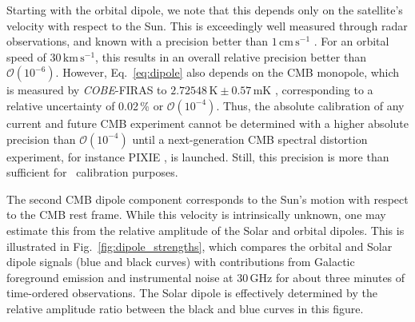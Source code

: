 \documentclass[twocolumn]{aa}
\def\COBE{\textit{COBE}}
\begin{document}
Starting with the orbital dipole, we note that this
depends only on the satellite's velocity with respect to the Sun. This
is exceedingly well measured through radar observations, and known
with a precision better than $1\,\textrm{cm}\,\textrm{s}^{-1}$
\citep{godard2009}. For an orbital speed of
$30\,\mathrm{km}\,\mathrm{s}^{-1}$, this results in an overall
relative precision better than $\mathcal{O}(10^{-6})$. However,
Eq.~\eqref{eq:dipole} also depends on the CMB monopole, which is
measured by \COBE-FIRAS to $2.72548\,\textrm{K} \pm 0.57\,\textrm{mK}$
\citep{fixsen2009}, corresponding to a relative uncertainty of
0.02\,\% or $\mathcal{O}(10^{-4})$. Thus, the absolute calibration of
any current and future CMB experiment cannot be determined with a
higher absolute precision than $\mathcal{O}(10^{-4})$ until a
next-generation CMB spectral distortion experiment, for instance PIXIE
\citep{kogut:2011}, is launched. Still, this precision is more than
sufficient for \Planck\ calibration purposes.

The second CMB dipole component corresponds to the Sun's motion with
respect to the CMB rest frame. While this velocity is intrinsically
unknown, one may estimate this from the relative amplitude of the
Solar and orbital dipoles. This is illustrated in
Fig.~\ref{fig:dipole_strengths}, which compares the orbital and Solar
dipole signals (blue and black curves) with contributions from
Galactic foreground emission and instrumental noise at 30\,GHz for
about three minutes of time-ordered observations. The Solar dipole is
effectively determined by the relative amplitude ratio between the
black and blue curves in this figure.
\end{document}
